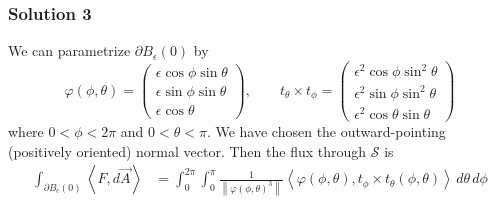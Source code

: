 \documentclass[10pt, t, allowdisplaybreaks]{beamer}
\begin{document}
\begin{frame}
    \frametitle{Solution 3}
    \par  We can parametrize $\partial B_\epsilon(0)$ by 
    \begin{equation*}
        \varphi(\phi, \theta) = \begin{pmatrix}
            \epsilon \cos \phi \sin \theta\\
            \epsilon \sin\phi \sin\theta\\
            \epsilon\cos\theta
        \end{pmatrix}, \qquad
        t_\theta\times t_\phi = \begin{pmatrix}
            \epsilon^2\cos\phi\sin^2\theta\\
            \epsilon^2\sin\phi\sin^2\theta\\
            \epsilon^2\cos\theta\sin\theta
        \end{pmatrix}
    \end{equation*}
    where $0<\phi<2\pi$ and $0<\theta<\pi$. We have chosen the outward-pointing (positively oriented) normal vector. Then the flux through $\mathcal{S}$ is 
    \begin{equation*}
        \begin{split}
            \int_{\partial B_\epsilon(0)}\left\langle F, d\overrightarrow{A} \right\rangle 
            &= \int^{2\pi}_0\int^\pi_0\frac{1}{\left\lVert \varphi(\phi,\theta)^3\right\rVert }\left\langle \varphi(\phi, \theta), t_\phi\times t_\theta(\phi, \theta)\right\rangle \,d\theta\,d\phi\\
        \end{split}
    \end{equation*}
\end{frame}
\end{document}
